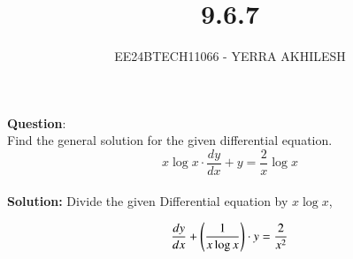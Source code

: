 \documentclass[journal]{IEEEtran}
\begin{document}

\vspace{3cm}

\title{9.6.7}
\author{EE24BTECH11066 - YERRA AKHILESH}
{\let\newpage\relax\maketitle}

\renewcommand{\thefigure}{\theenumi}
\renewcommand{\thetable}{\theenumi}
\setlength{\intextsep}{10pt} %

\renewcommand{\thetable}{\theenumi}
\textbf{Question}:\\
Find the general solution for the given differential equation.\\
$$x \log x \cdot \frac{dy}{dx} + y = \frac{2}{x} \log x$$\\
\textbf{Solution: }
Divide the given Differential equation by $x \log x$,

\begin{align}
    \frac{dy}{dx} + \left(\frac{1}{x \log x}\right) \cdot y = \frac{2}{x^2}
\end{align}
\end{document}
